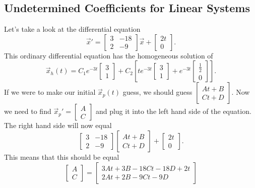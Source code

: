 \subsection{Undetermined Coefficients for Linear Systems}
\begin{eg}
  Let's take a look at the differential equation \[
    \vec{x}'=\begin{bmatrix} 3&-18\\2&-9 \end{bmatrix} \vec{x}+\begin{bmatrix} 2t\\0 \end{bmatrix} 
  .\] 
  This ordinary differential equation has the homogeneous solution of \[
    \vec{x}_h(t)=C_1e^{-3t}\begin{bmatrix} 3\\1 \end{bmatrix} +C_2\left[ te^{-3t}\begin{bmatrix} 3\\1 \end{bmatrix} +e^{-3t}\begin{bmatrix} \frac{1}{2}\\0 \end{bmatrix}  \right] 
  .\] 
  If we were to make our initial $\vec{x}_p(t)$ guess, we should guess $\begin{bmatrix} At+B\\Ct+D \end{bmatrix} $. Now we need to find $\vec{x}_p'=\begin{bmatrix} A\\C \end{bmatrix}$ and plug it into the left hand side of the equation. The right hand side will now equal \[
  \begin{bmatrix} 3&-18\\2&-9 \end{bmatrix} \begin{bmatrix} At+B\\Ct+D \end{bmatrix} +\begin{bmatrix} 2t\\0 \end{bmatrix} 
  .\] This means that this should be equal \[
  \begin{bmatrix} A\\C \end{bmatrix} =\begin{bmatrix} 3At+3B-18Ct-18D+2t\\2At+2B-9Ct-9D \end{bmatrix} 
\]
\end{eg}
